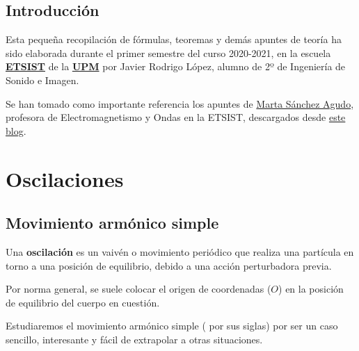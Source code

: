 \documentclass[a4paper]{book}
\begin{document}
\newpage
{}
{}
\section*{Introducción}
Esta pequeña recopilación de fórmulas, teoremas y demás apuntes de teoría ha sido elaborada durante el primer semestre del curso 2020-2021, en la escuela \href{https://www.etsist.upm.es/}{\textbf{ETSIST}} de la \href{http://www.upm.es/}{\textbf{UPM}} por Javier Rodrigo López, alumno de 2º de Ingeniería de Sonido e Imagen.

Se han tomado como importante referencia los apuntes de \href{https://www.etsist.upm.es/escuela/departamentos/EF/personal?departamento=EFF&idTrabajador=02819b0c47b0eac780a7d0e336d9862b}{Marta Sánchez Agudo}, profesora de Electromagnetismo y Ondas en la ETSIST, descargados desde \href{https://apuntesupmcampussur.wordpress.com/}{este blog}.


\newpage

\setlength{\parskip}{0em}
\tableofcontents
\setlength{\parskip}{0.5em}


\chapter{Oscilaciones}

\section{Movimiento armónico simple}
Una \textbf{oscilación} es un  vaivén o movimiento periódico que realiza una partícula en torno a una posición de equilibrio, debido a una acción perturbadora previa.

Por norma general, se suele colocar el origen de coordenadas ($O$) en la posición de equilibrio del cuerpo en cuestión.

Estudiaremos el movimiento armónico simple (\textbf{\mas} por sus siglas) por ser un caso sencillo, interesante y fácil de extrapolar a otras situaciones.
\end{document}
